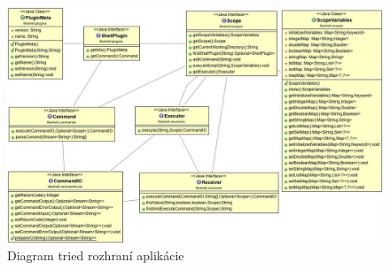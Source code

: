\begin{figure}[!htbp]
	\centering
	\includegraphics[width=\linewidth]{img/allinterfaces.jpg}
	\caption{Diagram tried rozhraní aplikácie}
	\label{fig:test}
\end{figure}